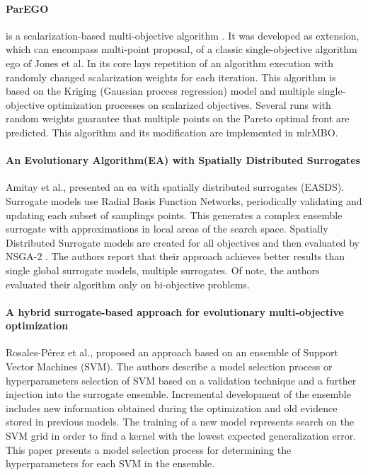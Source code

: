         \paragraph{ParEGO}\label{alg:ParEGO} is a scalarization-based multi-objective algorithm \cite{Knowles06}. It was developed as extension, which can encompass multi-point proposal, of a classic single-objective algorithm \gls{ego} \cite{JonesSW98} of Jones et al. In its core lays repetition of an algorithm execution with randomly changed scalarization weights for each iteration.  This algorithm is based on the Kriging (Gaussian process regression) model and multiple single-objective optimization processes on scalarized objectives. Several runs with random weights guarantee that multiple points on the Pareto optimal front are predicted. This algorithm and its modification are implemented in mlrMBO\cite{BischlmlrMBO}.


        \paragraph{An Evolutionary Algorithm(EA) with Spatially Distributed Surrogates} Amitay et al.,\cite{DistrSurr} presented an \gls{ea} with spatially distributed surrogates (EASDS). Surrogate models use Radial Basis Function Networks, periodically validating and updating each subset of samplings points. This generates a complex ensemble surrogate with approximations in local areas of the search space. Spatially Distributed Surrogate models are created for all objectives and then evaluated by NSGA-2 \cite{DistrSurr}. The authors report that their approach achieves better results than single global surrogate models, multiple surrogates. Of note, the authors evaluated their algorithm only on bi-objective problems.

        \paragraph{A hybrid surrogate-based approach for evolutionary multi-objective optimization} Rosales-Pérez et al.,\cite{HybridSurrRCG} proposed an approach based on an ensemble of Support Vector Machines (SVM). The authors describe a model selection process or hyperparameters selection of SVM based on a validation technique and a further injection into the surrogate ensemble. Incremental development of the ensemble includes new information obtained during the optimization and old evidence stored in previous models. 
        The training of a new model represents search on the SVM grid in order to find a kernel with the lowest expected generalization error. This paper presents a model selection process for determining the hyperparameters for each SVM in the ensemble.



